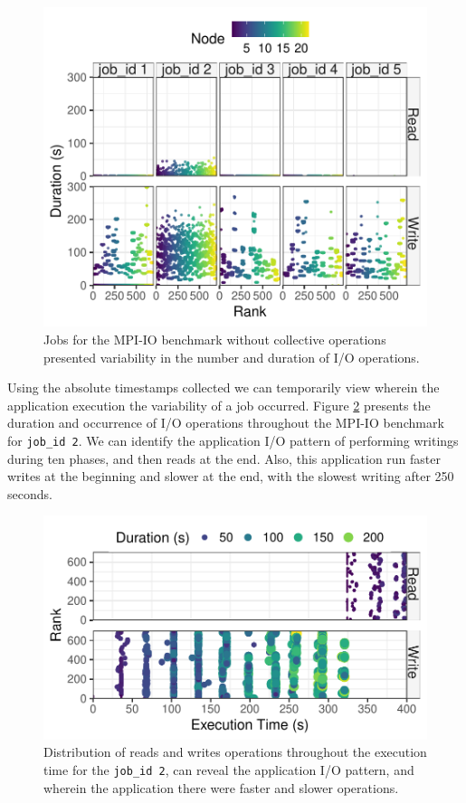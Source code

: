 \begin{figure}
	\centering
        \includegraphics[width=\linewidth]{figs/mpi_io_luster_no_coll_duration_allexperiments.pdf}
	\caption{Jobs for the MPI-IO benchmark without collective
          operations presented variability in the number and duration
          of I/O operations.}
	\label{f:mpi_io_all}
\end{figure}

Using the absolute timestamps collected we can temporarily view
wherein the application execution the variability of a job
occurred. Figure \ref{f:mpi_io} presents the duration and occurrence of
I/O operations throughout the MPI-IO benchmark for \texttt{job\_id
  2}. We can identify the application I/O pattern of performing
writings during ten phases, and then reads at the end. Also, this
application run faster writes at the beginning and slower at the end,
with the slowest writing after 250 seconds.
      
\begin{figure}
	\centering
	\includegraphics[width=\linewidth]{figs/255653_mpi_io_luster_no_coll_execution2.pdf}
	\caption{Distribution of reads and writes operations
          throughout the execution time for the \texttt{job\_id 2},
          can reveal the application I/O pattern, and wherein the
          application there were faster and slower operations.}
	\label{f:mpi_io}
\end{figure}

